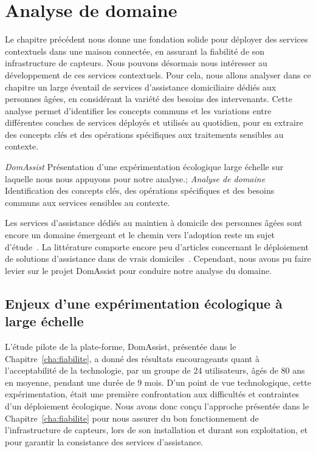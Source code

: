 \chapter{Analyse de domaine}\label{chap:domain}
\begin{preamble}
Le chapitre précédent nous donne une fondation solide pour déployer des services contextuels dans une maison connectée, 
en assurant la fiabilité de son infrastructure de capteurs. 
Nous pouvons désormais nous intéresser au développement de ces services contextuels.
Pour cela, nous allons analyser dans ce chapitre un large éventail de services d'assistance domiciliaire 
dédiés aux personnes âgées, en considérant la variété des besoins des 
intervenants. 
Cette analyse permet d'identifier les concepts communs et les variations
entre différentes couches de services déployés et utilisés au quotidien,
pour en extraire des concepts clés et des opérations spécifiques aux
traitements sensibles au contexte\footnotemark{}.
\end{preamble}
{
{\em DomAssist} Présentation d'une expérimentation écologique large échelle sur laquelle nous nous appuyons pour notre analyse.;
{\em Analyse de domaine} Identification des concepts clés, des opérations spécifiques et des besoins communs aux services sensibles au contexte.
}

Les services d'assistance dédiés au maintien à domicile
des personnes âgées sont encore un domaine émergeant et le chemin vers l'adoption
reste un sujet d'étude~. La littérature
comporte encore peu d'articles concernant le déploiement de solutions
d'assistance dans de vrais domiciles~. 
Cependant, nous avons pu faire levier
sur le projet DomAssist pour conduire notre analyse du domaine.

\section{Enjeux d'une expérimentation écologique à large échelle}\label{domain:expe}
L'étude pilote de la plate-forme, DomAssist, présentée dans le 
Chapitre~\ref{cha:fiabilite}, a donné des résultats 
encourageants quant à l'acceptabilité de la technologie, par un groupe de 24 
utilisateurs, âgés de 80 ans en moyenne, pendant une durée 
de 9 mois. D'un point de vue technologique, cette expérimentation, était une 
première confrontation aux difficultés et contraintes d'un déploiement écologique.
Nous avons donc conçu l'approche présentée dans le Chapitre~\ref{cha:fiabilite}
pour nous assurer du bon fonctionnement de l'infrastructure de
capteurs, lors de son installation et durant son exploitation, et pour garantir la consistance des 
services d'assistance.


